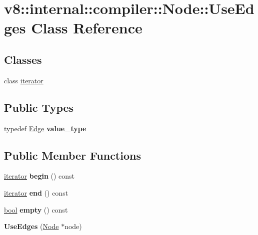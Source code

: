 \hypertarget{classv8_1_1internal_1_1compiler_1_1Node_1_1UseEdges}{}\section{v8\+:\+:internal\+:\+:compiler\+:\+:Node\+:\+:Use\+Edges Class Reference}
\label{classv8_1_1internal_1_1compiler_1_1Node_1_1UseEdges}
\subsection*{Classes}
\begin{DoxyCompactItemize}
\item 
class \mbox{\hyperlink{classv8_1_1internal_1_1compiler_1_1Node_1_1UseEdges_1_1iterator}{iterator}}
\end{DoxyCompactItemize}
\subsection*{Public Types}
\begin{DoxyCompactItemize}
\item 
\mbox{\label{classv8_1_1internal_1_1compiler_1_1Node_1_1UseEdges_a06b09d5d04383a3503dde2eb8591a20a}} 
typedef \mbox{\hyperlink{classv8_1_1internal_1_1compiler_1_1Edge}{Edge}} {\bfseries value\+\_\+type}
\end{DoxyCompactItemize}
\subsection*{Public Member Functions}
\begin{DoxyCompactItemize}
\item 
\mbox{\label{classv8_1_1internal_1_1compiler_1_1Node_1_1UseEdges_a44e352787366589d6bd9743940d5569d}} 
\mbox{\hyperlink{classv8_1_1internal_1_1compiler_1_1Node_1_1UseEdges_1_1iterator}{iterator}} {\bfseries begin} () const
\item 
\mbox{\label{classv8_1_1internal_1_1compiler_1_1Node_1_1UseEdges_ad6f9b1f8c731b50167352e538fa07371}} 
\mbox{\hyperlink{classv8_1_1internal_1_1compiler_1_1Node_1_1UseEdges_1_1iterator}{iterator}} {\bfseries end} () const
\item 
\mbox{\label{classv8_1_1internal_1_1compiler_1_1Node_1_1UseEdges_aaab0cf1338ac8eec8219016e48efc1cd}} 
\mbox{\hyperlink{classbool}{bool}} {\bfseries empty} () const
\item 
\mbox{\label{classv8_1_1internal_1_1compiler_1_1Node_1_1UseEdges_a59105285a32885731589dc91fd1cec82}} 
{\bfseries Use\+Edges} (\mbox{\hyperlink{classv8_1_1internal_1_1compiler_1_1Node}{Node}} $\ast$node)
\end{DoxyCompactItemize}


